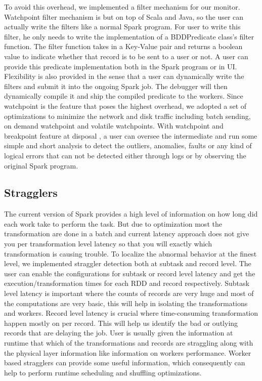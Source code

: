 \documentclass{acm_proc_article-sp}
\begin{document}
To avoid this overhead, we implemented a filter mechanism for our monitor. Watchpoint filter mechanism is but on top of Scala and Java, so the user can actually write the filters like a normal Spark program.  For user to write this filter, he only needs to write the implementation of a BDDPredicate class's filter function. The filter function takes in a Key-Value pair and returns a boolean value to indicate whether that record is to be sent to a user or not. A user can provide this predicate implementation both in the Spark program or in UI.  Flexibility is also provided in the sense that a user can dynamically write the filters and submit it into the ongoing Spark job. The debugger will then dynamically compile it and ship the compiled predicate to the workers. Since watchpoint is the feature that poses the highest overhead, we adopted a set of optimizations to minimize the network and disk traffic including batch sending, on demand watchpoint and volatile watchpoints. With watchpoint and breakpoint feature at disposal , a user can oversee the intermediate and run some simple and short analysis to detect the outliers, anomalies, faults or any kind of logical errors that can not be detected either through logs or by observing the original Spark program. 


 
\subsection{Stragglers}

The current version of Spark provides a high level of information on how long did each work take to perform the task. But due to optimization most the transformation are done in a batch and current latency approach does not give you per transformation level latency so that you will exactly which transformation is causing trouble. To localize the abnormal behavior at the finest level, we implemented straggler detection both at subtask and record level. The user can enable the configurations for subtask or record level latency and get the execution/transformation times for each RDD and record respectively. Subtask level latency is important where the counts of records are very huge and most of the computations are very basic, this will help in isolating the transformations and workers. Record level latency is crucial where time-consuming transformation happen mostly on per record. This will help us identify the bad or outlying records that are delaying the job. User is usually given the information at runtime that which of the transformations and records are straggling along with the physical layer information like information on workers performance. Worker based stragglers can provide some useful information, which consequently can help to perform runtime scheduling and shuffling optimizations.
\end{document}
